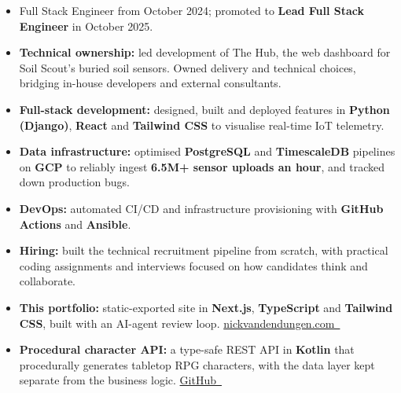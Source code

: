 \documentclass[10pt,a4paper,ragged2e,withhyper]{altacv}
\newcommand{\cvlink}[2]{\href{#1}{\color{Teal}#2~\raisebox{0.1ex}{\scriptsize$\nearrow$}}}
\begin{document}
\begin{itemize}
  \item Full Stack Engineer from October 2024; promoted to \textbf{Lead Full Stack Engineer} in October 2025.
  \item \textbf{Technical ownership:} led development of The Hub, the web dashboard for Soil Scout's buried soil
        sensors. Owned delivery and technical choices, bridging in-house developers and external consultants.
  \item \textbf{Full-stack development:} designed, built and deployed features in \textbf{Python (Django)},
        \textbf{React} and \textbf{Tailwind CSS} to visualise real-time IoT telemetry.
  \item \textbf{Data infrastructure:} optimised \textbf{PostgreSQL} and \textbf{TimescaleDB} pipelines on \textbf{GCP}
        to reliably ingest \textbf{6.5M+ sensor uploads an hour}, and tracked down production bugs.
  \item \textbf{DevOps:} automated CI/CD and infrastructure provisioning with \textbf{GitHub Actions} and \textbf{Ansible}.
  \item \textbf{Hiring:} built the technical recruitment pipeline from scratch, with practical coding assignments
        and interviews focused on how candidates think and collaborate.
\end{itemize}

\begin{itemize}
  \item \textbf{This portfolio:} static-exported site in \textbf{Next.js}, \textbf{TypeScript} and \textbf{Tailwind CSS},
        built with an AI-agent review loop. \cvlink{https://www.nickvandendungen.com}{nickvandendungen.com}
  \item \textbf{Procedural character API:} a type-safe REST API in \textbf{Kotlin} that procedurally generates tabletop
        RPG characters, with the data layer kept separate from the business logic.
        \cvlink{https://github.com/Nicktvdd/DnD-Api}{GitHub}
\end{itemize}
\end{document}
